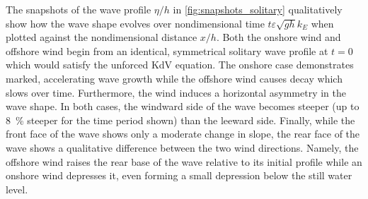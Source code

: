 \documentclass{jfm}
\renewcommand*{\epsilon}{\varepsilon}
\begin{document}
The snapshots of the wave profile $\eta/h$ in
\cref{fig:snapshots_solitary} qualitatively show how the wave shape
evolves over nondimensional time $t \epsilon \sqrt{g h} k_E$ when
plotted against the nondimensional distance $x/h$.
Both the onshore wind  and offshore
wind  begin from an identical,
symmetrical solitary wave profile at $t=0$ which would satisfy the
unforced KdV equation.
The onshore case  demonstrates
marked, accelerating wave growth while the offshore wind
 causes decay which slows over time.
Furthermore, the wind induces a horizontal asymmetry in the wave shape.
In both cases, the windward side of the wave becomes steeper (up to
\SI{8}{\percent} steeper for the time period shown) than the leeward
side.
Finally, while the front face of the wave shows only a moderate change in
slope, the rear face of the wave shows a qualitative difference between
the two wind directions.
Namely, the offshore wind raises the rear base of the wave relative to
its initial profile while an onshore wind depresses it, even forming a
small depression below the still water level.
\end{document}
